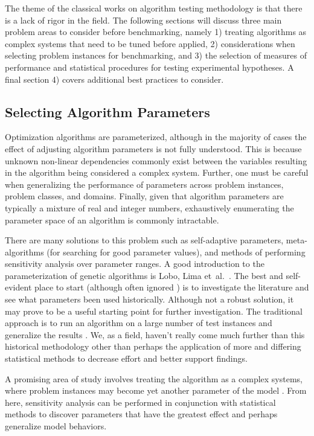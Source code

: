 The theme of the classical works on algorithm testing methodology is that there is a lack of rigor in the field. The following sections will discuss three main problem areas to consider before benchmarking, namely 1) treating algorithms as complex systems that need to be tuned before applied, 2) considerations when selecting problem instances for benchmarking, and 3) the selection of measures of performance and statistical procedures for testing experimental hypotheses. A final section 4) covers additional best practices to consider.


% 
% 
\subsection{Selecting Algorithm Parameters}
Optimization algorithms are parameterized, although in the majority of cases the effect of adjusting algorithm parameters is not fully understood. This is because unknown non-linear dependencies commonly exist between the variables resulting in the algorithm being considered a complex system. Further, one must be careful when generalizing the performance of parameters across problem instances, problem classes, and domains. Finally, given that algorithm parameters are typically a mixture of real and integer numbers, exhaustively enumerating the parameter space of an algorithm is commonly intractable.

There are many solutions to this problem such as self-adaptive parameters, meta-algorithms (for searching for good parameter values), and methods of performing sensitivity analysis over parameter ranges. A good introduction to the parameterization of genetic algorithms is Lobo, Lima et~al.\ \cite{Lobo2007}. The best and self-evident place to start (although often ignored \cite{Eiben2002}) is to investigate the literature and see what parameters been used historically. Although not a robust solution, it may prove to be a useful starting point for further investigation. The traditional approach is to run an algorithm on a large number of test instances and generalize the results \cite{Schaffer1989}. We, as a field, haven't really come much further than this historical methodology other than perhaps the application of more and differing statistical methods to decrease effort and better support findings.

A promising area of study involves treating the algorithm as a complex systems, where problem instances may become yet another parameter of the model \cite{Saltelli2002, Campolongo2000}. From here, sensitivity analysis can be performed in conjunction with statistical methods to discover parameters that have the greatest effect \cite{Chan1997} and perhaps generalize model behaviors.

